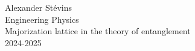 



\vspace*{\fill}
\noindent Alexander Stévins\\
Engineering Physics\\
Majorization lattice in the theory of entanglement\\
2024-2025


